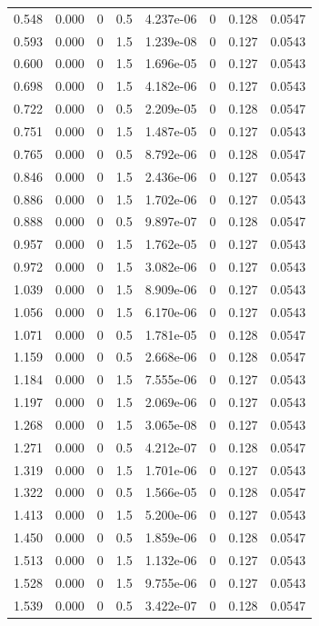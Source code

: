 \documentclass[preview]{standalone}
\begin{document}
{{\begin{tabular}{L{1.2cm}C{1.2cm} C{0.3cm}C{0.5cm} C{1.4cm}C{1.4cm} C{1.4cm}C{1.4cm}}
  0.548  &  0.000  & 0     & 0.5 &  4.237e-06  & 0  & 0.128 &  0.0547   \\ 
  0.593  &  0.000  & 0     & 1.5 &  1.239e-08  & 0  & 0.127 &  0.0543   \\ 
  0.600  &  0.000  & 0     & 1.5 &  1.696e-05  & 0  & 0.127 &  0.0543   \\ 
  0.698  &  0.000  & 0     & 1.5 &  4.182e-06  & 0  & 0.127 &  0.0543   \\ 
  0.722  &  0.000  & 0     & 0.5 &  2.209e-05  & 0  & 0.128 &  0.0547   \\ 
  0.751  &  0.000  & 0     & 1.5 &  1.487e-05  & 0  & 0.127 &  0.0543   \\ 
  0.765  &  0.000  & 0     & 0.5 &  8.792e-06  & 0  & 0.128 &  0.0547   \\ 
  0.846  &  0.000  & 0     & 1.5 &  2.436e-06  & 0  & 0.127 &  0.0543   \\ 
  0.886  &  0.000  & 0     & 1.5 &  1.702e-06  & 0  & 0.127 &  0.0543   \\ 
  0.888  &  0.000  & 0     & 0.5 &  9.897e-07  & 0  & 0.128 &  0.0547   \\ 
  0.957  &  0.000  & 0     & 1.5 &  1.762e-05  & 0  & 0.127 &  0.0543   \\ 
  0.972  &  0.000  & 0     & 1.5 &  3.082e-06  & 0  & 0.127 &  0.0543   \\ 
  1.039  &  0.000  & 0     & 1.5 &  8.909e-06  & 0  & 0.127 &  0.0543   \\ 
  1.056  &  0.000  & 0     & 1.5 &  6.170e-06  & 0  & 0.127 &  0.0543   \\ 
  1.071  &  0.000  & 0     & 0.5 &  1.781e-05  & 0  & 0.128 &  0.0547   \\ 
  1.159  &  0.000  & 0     & 0.5 &  2.668e-06  & 0  & 0.128 &  0.0547   \\ 
  1.184  &  0.000  & 0     & 1.5 &  7.555e-06  & 0  & 0.127 &  0.0543   \\ 
  1.197  &  0.000  & 0     & 1.5 &  2.069e-06  & 0  & 0.127 &  0.0543   \\ 
  1.268  &  0.000  & 0     & 1.5 &  3.065e-08  & 0  & 0.127 &  0.0543   \\ 
  1.271  &  0.000  & 0     & 0.5 &  4.212e-07  & 0  & 0.128 &  0.0547   \\ 
  1.319  &  0.000  & 0     & 1.5 &  1.701e-06  & 0  & 0.127 &  0.0543   \\ 
  1.322  &  0.000  & 0     & 0.5 &  1.566e-05  & 0  & 0.128 &  0.0547   \\ 
  1.413  &  0.000  & 0     & 1.5 &  5.200e-06  & 0  & 0.127 &  0.0543   \\ 
  1.450  &  0.000  & 0     & 0.5 &  1.859e-06  & 0  & 0.128 &  0.0547   \\ 
  1.513  &  0.000  & 0     & 1.5 &  1.132e-06  & 0  & 0.127 &  0.0543   \\ 
  1.528  &  0.000  & 0     & 1.5 &  9.755e-06  & 0  & 0.127 &  0.0543   \\ 
  1.539  &  0.000  & 0     & 0.5 &  3.422e-07  & 0  & 0.128 &  0.0547   \\ 
\hline 
\end{tabular} 

}}
\end{document}
